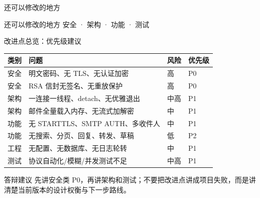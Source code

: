 \documentclass[aspectratio=169,10pt]{beamer}
\begin{document}
\begin{frame}{还可以修改的地方}
  \begin{center}
    \Huge 还可以修改的地方
    \vspace{0.5cm}
    \large 安全 · 架构 · 功能 · 测试
  \end{center}
\end{frame}

\begin{frame}{改进点总览：优先级建议}
  \small
  \begin{table}
    \centering
    \begin{tabular}{p{}p{}p{}p{}}
      \toprule
      \textbf{类别} & \textbf{问题} & \textbf{风险} & \textbf{优先级} \\
      \midrule
      安全 & 明文密码、无 TLS、无认证加密 & 高 & P0 \\
      安全 & RSA 信封无签名、无重放保护 & 高 & P0 \\
      架构 & 一连接一线程、detach、无优雅退出 & 中高 & P1 \\
      架构 & 邮件全量载入内存、无流式加解密 & 中 & P1 \\
      功能 & 无 STARTTLS、SMTP AUTH、多收件人 & 中 & P1 \\
      功能 & 无搜索、分页、回复、转发、草稿 & 低 & P2 \\
      工程 & 无配置、无数据库、无日志轮转 & 中 & P1 \\
      测试 & 协议自动化/模糊/并发测试不足 & 中高 & P1 \\
      \bottomrule
    \end{tabular}
  \end{table}
  \begin{block}{答辩建议}
    \small
    先讲安全类 P0，再讲架构和测试；不要把改进点讲成项目失败，而是讲清楚当前版本的设计权衡与下一步路线。
  \end{block}
\end{frame}
\end{document}
